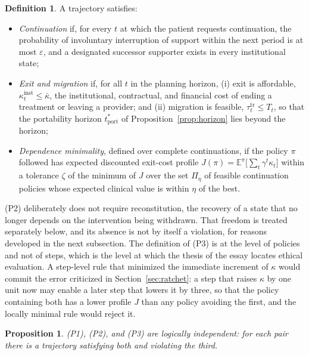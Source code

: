 \documentclass[11pt]{article}
\theoremstyle{plain}
\newtheorem{proposition}{Proposition}
\theoremstyle{definition}
\newtheorem{definition}{Definition}
\theoremstyle{remark}
\newcommand{\E}{\mathbb{E}}
\begin{document}
\begin{definition}
A trajectory satisfies:
\begin{itemize}
\item[\textbf{(P1)}] \emph{Continuation} if, for every $t$ at which the patient requests continuation, the probability of involuntary interruption of support within the next period is at most $\varepsilon$, and a designated successor supporter exists in every institutional state;
\item[\textbf{(P2)}] \emph{Exit and migration} if, for all $t$ in the planning horizon, (i) exit is affordable, $\kappa^{\mathrm{inst}}_t\le\bar\kappa$, the institutional, contractual, and financial cost of ending a treatment or leaving a provider; and (ii) migration is feasible, $\tau^{\mathrm{tr}}_t\le T_t$, so that the portability horizon $t^\ast_{\mathrm{port}}$ of Proposition~\ref{prop:horizon} lies beyond the horizon;
\item[\textbf{(P3)}] \emph{Dependence minimality}, defined over complete continuations, if the policy $\pi$ followed has expected discounted exit-cost profile $J(\pi)=\E^\pi\big[\sum_{t}\gamma^t\kappa_t\big]$ within a tolerance $\zeta$ of the minimum of $J$ over the set $\Pi_\eta$ of feasible continuation policies whose expected clinical value is within $\eta$ of the best.
\end{itemize}
\end{definition}

(P2) deliberately does not require reconstitution, the recovery of a state that no longer depends on the intervention being withdrawn. That freedom is treated separately below, and its absence is not by itself a violation, for reasons developed in the next subsection. The definition of (P3) is at the level of policies and not of steps, which is the level at which the thesis of the essay locates ethical evaluation. A step-level rule that minimized the immediate increment of $\kappa$ would commit the error criticized in Section~\ref{sec:ratchet}: a step that raises $\kappa$ by one unit now may enable a later step that lowers it by three, so that the policy containing both has a lower profile $J$ than any policy avoiding the first, and the locally minimal rule would reject it.

\begin{proposition}\label{prop:independence}
(P1), (P2), and (P3) are logically independent: for each pair there is a trajectory satisfying both and violating the third.
\end{proposition}
\end{document}
